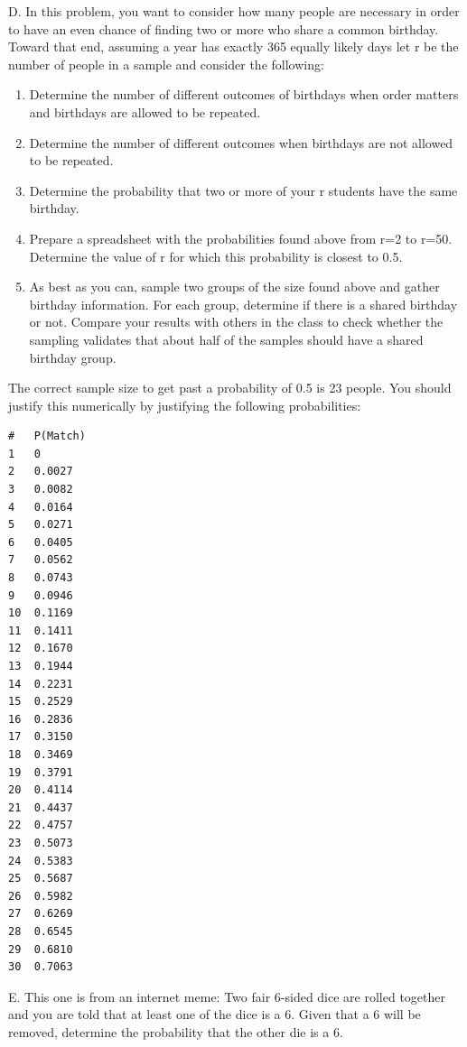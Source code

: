 \documentclass[10pt,]{book}
\theoremstyle{plain}
\theoremstyle{definition}
\theoremstyle{definition}
\theoremstyle{definition}
\numberwithin{equation}{section}
\begin{document}
	D. In this problem, you want to consider how many people are necessary in order to have an even chance of finding two or more who share a common birthday. Toward that end, assuming a year has exactly 365 equally likely days let r be the number of people in a sample and consider the following:
	\leavevmode%
\begin{enumerate}
\item\hypertarget{li-125}{}Determine the number of different outcomes of birthdays when order matters and birthdays are allowed to be repeated.%
\item\hypertarget{li-126}{}Determine the number of different outcomes when birthdays are not allowed to be repeated.%
\item\hypertarget{li-127}{}Determine the probability that two or more of your r students have the same birthday.%
\item\hypertarget{li-128}{}Prepare a spreadsheet with the probabilities found above from r=2 to r=50. Determine the value of r for which this probability is closest to 0.5.%
\item\hypertarget{li-129}{}As best as you can, sample two groups of the size found above and gather birthday information. For each group, determine if there is a shared birthday or not.  Compare your results with others in the class to check whether the sampling validates that about half of the samples should have a shared birthday group.%
\end{enumerate}

	
	
	The correct sample size to get past a probability of 0.5 is 23 people. You should justify this numerically by justifying the following probabilities:
\begin{verbatim}
#	P(Match)	
1	0
2	0.0027
3	0.0082
4	0.0164
5	0.0271
6	0.0405
7	0.0562
8	0.0743
9	0.0946
10	0.1169
11	0.1411
12	0.1670
13	0.1944
14	0.2231
15	0.2529
16	0.2836
17	0.3150
18	0.3469
19	0.3791
20	0.4114
21	0.4437
22	0.4757
23	0.5073
24	0.5383
25	0.5687
26	0.5982
27	0.6269
28	0.6545
29	0.6810
30	0.7063
\end{verbatim}


\par

	E.  This one is from an internet meme:  Two fair 6-sided dice are rolled together and you are told that at least one of the dice is a 6. Given that a 6 will be removed, determine the probability that the other die is a 6.
\end{document}

